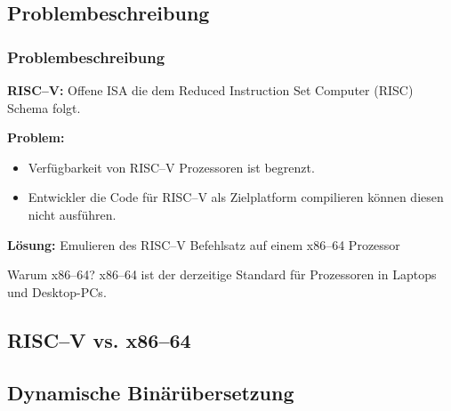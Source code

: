\subsection{Problembeschreibung} %
\begin{frame}
    \frametitle{Problembeschreibung}

    \vspace{0.50cm}

    \textbf{RISC--V:} Offene ISA die dem Reduced Instruction Set Computer (RISC) Schema folgt.

    \vspace{0.50cm}

    \textbf{Problem:}
    \begin{itemize}
        \item Verfügbarkeit von RISC--V Prozessoren ist begrenzt.
        \item Entwickler die Code für RISC--V als Zielplatform compilieren können diesen nicht ausführen.
    \end{itemize}

    \vspace{0.50cm}

    \textbf{Lösung:} Emulieren des RISC--V Befehlsatz auf einem x86--64 Prozessor

    \vspace{0.50cm}

    \begin{block}{Warum x86--64?}
        x86--64 ist der derzeitige Standard für Prozessoren in Laptops und Desktop-PCs.
    \end{block}
\end{frame}

\subsection{RISC--V vs. x86--64} %

\subsection{Dynamische Binärübersetzung} %

